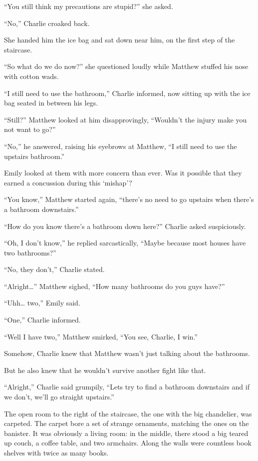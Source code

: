“You still think my precautions are stupid?” she asked.

“No,” Charlie croaked back.

She handed him the ice bag and sat down near him, on the first step of the staircase.

“So what do we do now?” she questioned loudly while Matthew stuffed his nose with  cotton wads.

“I still need to use the bathroom,” Charlie informed, now sitting up with the ice bag seated in between his legs.

“Still?” Matthew looked at him disapprovingly, “Wouldn’t the injury make you not want to go?”

“No,” he answered, raising his eyebrows at Matthew, “I still need to use the upstairs bathroom.”

Emily looked at them with more concern than ever. Was it possible that they earned a concussion during this ‘mishap’?

“You know,” Matthew started again, “there’s no need to go upstairs when there’s a bathroom downstairs.”

“How do you know there’s a bathroom down here?” Charlie asked suspiciously.

“Oh, I don’t know,” he replied sarcastically, “Maybe because most houses have two bathrooms?”

“No, they don’t,” Charlie stated.

“Alright…” Matthew sighed, “How many bathrooms do you guys have?”

“Uhh… two,” Emily said.

“One,” Charlie informed.

“Well I have two,” Matthew smirked, “You see, Charlie, I win.”

Somehow, Charlie knew that Matthew wasn’t just talking about the bathrooms.

But he also knew that he wouldn’t survive another fight like that.

“Alright,” Charlie said grumpily, “Lets try to find a bathroom downstairs and if we don’t, we’ll go straight upstairs.”

\bigskip

The open room to the right of the staircase, the one with the big chandelier, was carpeted. The carpet bore a set of strange ornaments, matching the ones on the banister. It was obviously a living room: in the middle, there stood a big teared up couch, a coffee table, and two armchairs. Along the walls were countless book shelves with twice as many books.

